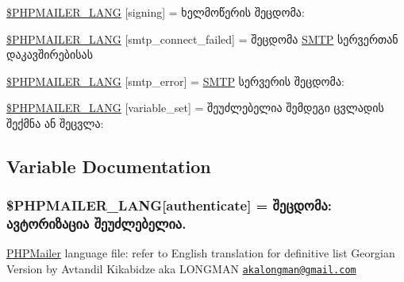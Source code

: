 \begin{DoxyCompactItemize}
\item 
\hyperlink{phpmailer_8lang-ka_8php_a68e437bdb9b968a5a67320f03d231565}{\$\+P\+H\+P\+M\+A\+I\+L\+E\+R\+\_\+\+L\+A\+NG} \mbox{[}\textquotesingle{}signing\textquotesingle{}\mbox{]} = \textquotesingle{}ხელმოწერის შეცდომა\+: \textquotesingle{}
\item 
\hyperlink{phpmailer_8lang-ka_8php_a7b321d4ca1e9df702403ed4c61aa0980}{\$\+P\+H\+P\+M\+A\+I\+L\+E\+R\+\_\+\+L\+A\+NG} \mbox{[}\textquotesingle{}smtp\+\_\+connect\+\_\+failed\textquotesingle{}\mbox{]} = \textquotesingle{}შეცდომა \hyperlink{class_s_m_t_p}{S\+M\+TP} სერვერთან დაკავშირებისას\textquotesingle{}
\item 
\hyperlink{phpmailer_8lang-ka_8php_a7d9cffba1e669c845f8a4c891ee50064}{\$\+P\+H\+P\+M\+A\+I\+L\+E\+R\+\_\+\+L\+A\+NG} \mbox{[}\textquotesingle{}smtp\+\_\+error\textquotesingle{}\mbox{]} = \textquotesingle{}\hyperlink{class_s_m_t_p}{S\+M\+TP} სერვერის შეცდომა\+: \textquotesingle{}
\item 
\hyperlink{phpmailer_8lang-ka_8php_af795debc7a739d038742691c358d9032}{\$\+P\+H\+P\+M\+A\+I\+L\+E\+R\+\_\+\+L\+A\+NG} \mbox{[}\textquotesingle{}variable\+\_\+set\textquotesingle{}\mbox{]} = \textquotesingle{}შეუძლებელია შემდეგი ცვლადის შექმნა ან შეცვლა\+: \textquotesingle{}
\end{DoxyCompactItemize}


\subsection{Variable Documentation}
\subsubsection[{\texorpdfstring{\$\+P\+H\+P\+M\+A\+I\+L\+E\+R\+\_\+\+L\+A\+NG}{$PHPMAILER_LANG}}]{\setlength{\rightskip}{0pt plus 5cm}\$P\+H\+P\+M\+A\+I\+L\+E\+R\+\_\+\+L\+A\+NG\mbox{[}\textquotesingle{}authenticate\textquotesingle{}\mbox{]} =  შეცდომა\+: ავტორიზაცია შეუძლებელია.\textquotesingle{}}\hypertarget{phpmailer_8lang-ka_8php_a2cb33073c989b85580748e331ed8b4aa}{}\label{phpmailer_8lang-ka_8php_a2cb33073c989b85580748e331ed8b4aa}
\hyperlink{class_p_h_p_mailer}{P\+H\+P\+Mailer} language file\+: refer to English translation for definitive list Georgian Version by Avtandil Kikabidze aka L\+O\+N\+G\+M\+AN \href{mailto:akalongman@gmail.com}{\tt akalongman@gmail.\+com} 

